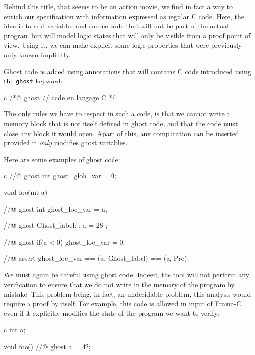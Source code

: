
Behind this title, that seems to be an action movie, we find in fact a
way to enrich our specification with information expressed as regular C
code. Here, the idea is to add variables and source code that will not
be part of the actual program but will model logic states that will only
be visible from a proof point of view. Using it, we can make explicit
some logic properties that were previously only known implicitly.




Ghost code is added using annotations that will contains C code
introduced using the \texttt{ghost} keyword:



\begin{CodeBlock}{c}
/*@
  ghost
  // code en langage C
*/
\end{CodeBlock}



The only rules we have to respect in such a code, is that we cannot
write a memory block that is not itself defined in ghost code, and that
the code must close any block it would open. Apart of this, any
computation can be inserted provided it \emph{only} modifies ghost
variables.




Here are some examples of ghost code:



\begin{CodeBlock}{c}
//@ ghost int ghost_glob_var = 0;

void foo(int a){
  //@ ghost int ghost_loc_var = a;

  //@ ghost Ghost_label: ;
  a = 28 ;

  //@ ghost if(a < 0){ ghost_loc_var = 0; }

  //@ assert ghost_loc_var == \at(a, Ghost_label) == \at(a, Pre);
}
\end{CodeBlock}



We must again be careful using ghost code. Indeed, the tool will not
perform any verification to ensure that we do not write in the memory of
the program by mistake. This problem being, in fact, an undecidable
problem, this analysis would require a proof by itself. For example,
this code is allowed in input of Frama-C even if it explicitly modifies
the state of the program we want to verify:



\begin{CodeBlock}{c}
int a;

void foo(){
  //@ ghost a = 42;
}
\end{CodeBlock}



